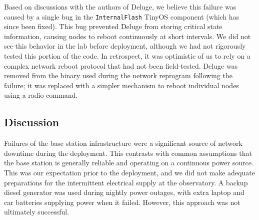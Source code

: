 Based on discussions with the authors of Deluge, we believe this failure was
caused by a single bug in the {\tt InternalFlash} TinyOS component (which has
since been fixed).  This bug prevented Deluge from storing critical state
information, causing nodes to reboot continuously at short intervals.  We did
not see this behavior in the lab before deployment, although we had not
rigorously tested this portion of the code. In retrospect, it was optimistic
of us to rely on a complex network reboot protocol that had not been
field-tested.  Deluge was removed from the binary used during the network
reprogram following the failure; it was replaced with a simpler mechanism to
reboot individual nodes using a radio command.




\subsection{Discussion}

Failures of the base station infrastructure were a significant
source of network downtime during the deployment.  This contrasts with 
common assumptions
that the base station is generally reliable and operating on a continuous
power source. This was our expectation prior to the deployment, and we did
not make adequate preparations for the intermittent electrical supply at the
observatory. A backup diesel generator was used during nightly power outages,
with extra laptop and car batteries supplying power when it failed.  However,
this approach was not ultimately successful.

